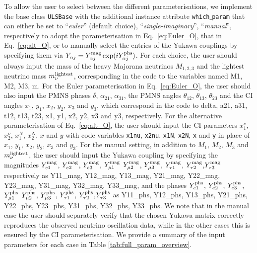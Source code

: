 \documentclass[12pt, a4paper]{article}
\newcommand{\virg}[1]{``#1''}
\newcommand{\mnulight}{m_{\nu}^{\rm lightest}}
\begin{document}
To allow the user to select between the different parameterisations, we implement the base class \texttt{ULSBase} with the additional instance attribute \texttt{which$\_$param} that can either be set to \virg{\textit{euler}} (default choice), \virg{\textit{single-imaginary}}, \virg{\textit{manual}}, respectively to adopt the parameterisation in Eq.~\eqref{eq:Euler_O}, that in Eq.~\eqref{eq:alt_O}, or to manually select the entries of the Yukawa couplings by specifying them via $Y_{\alpha j} = Y_{\alpha j}^{\rm mag}\,\text{exp}(i Y_{\alpha j}^{\rm phs})$. For each choice, the user should always input the mass of the heavy Majorana neutrinos $M_{1,2,3}$ and the lightest neutrino mass $\mnulight$, corresponding in the code to the variables named
{\ttm M1}, {\ttm M2}, {\ttm M3}, {\ttm m}. For the Euler parameterisation in Eq.~\eqref{eq:Euler_O}, the user should also input the PMNS phases $\delta$, $\alpha_{21}$, $\alpha_{31}$, the PMNS angles $\theta_{12}$, $\theta_{13}$, $\theta_{23}$ and the CI angles
$x_1$, $y_1$, $x_2$, $y_2$, $x_3$ and $y_3$, which correspond in the code to {\ttm delta}, {\ttm a21}, {\ttm a31}, {\ttm t12}, {\ttm t13}, {\ttm t23},
{\ttm x1}, {\ttm y1}, {\ttm x2}, {\ttm y2}, {\ttm x3} and {\ttm y3}, respectively.
For the alternative parameterisation of Eq.~\eqref{eq:alt_O}, the user should input the CI parameters 
$x_1^\nu$, $x_2^\nu$, $x_1^N$, $x_2^N$, $x$ and $y$ with code variables 
\texttt{x1nu}, \texttt{x2nu}, \texttt{x1N}, \texttt{x2N}, \texttt{x} and \texttt{y} 
in place of $x_1$, $y_1$, $x_2$, $y_2$, $x_3$ and $y_3$.
For the manual setting, in addition to $M_1$, $M_2$, $M_3$ and $\mnulight$, the user should input the Yukawa coupling by specifying the magnitudes $Y_{e1}^{\rm mag}$, $Y_{e2}^{\rm mag}$, $Y_{e3}^{\rm mag}$, $Y_{\mu1}^{\rm mag}$ $Y_{\mu 2}^{\rm mag}$, $Y_{\mu 3}^{\rm mag}$, $Y_{\tau 1}^{\rm mag}$, $Y_{\tau 2}^{\rm mag}$,$Y_{\tau 3}^{\rm mag}$ respectively as
{\ttm Y11\_mag}, {\ttm Y12\_mag}, {\ttm Y13\_mag}, {\ttm Y21\_mag}, {\ttm Y22\_mag}, {\ttm Y23\_mag}, {\ttm Y31\_mag}, {\ttm Y32\_mag}, {\ttm Y33\_mag},
and the phases $Y_{e1}^{\rm phs}$, $Y_{e2}^{\rm phs}$, $Y_{e3}^{\rm phs}$, $Y_{\mu1}^{\rm phs}$ $Y_{\mu 2}^{\rm phs}$, $Y_{\mu 3}^{\rm phs}$, $Y_{\tau 1}^{\rm phs}$, $Y_{\tau 2}^{\rm phs}$,$Y_{\tau 3}^{\rm phs}$ as
{\ttm Y11\_phs}, {\ttm Y12\_phs}, {\ttm Y13\_phs}, {\ttm Y21\_phs}, {\ttm Y22\_phs}, {\ttm Y23\_phs}, {\ttm Y31\_phs}, {\ttm Y32\_phs}, {\ttm Y33\_phs}. We note that in the manual case the user should separately verify that the chosen Yukawa matrix correctly reproduces the observed neutrino oscillation data, while in the other cases this is ensured by the CI parameterisation. We provide a summary of the input parameters for each case in Table \ref{tab:full_param_overview}. 
\end{document}
